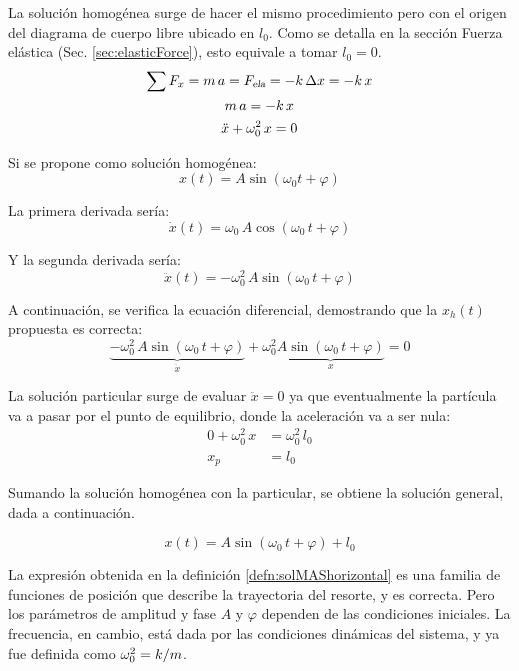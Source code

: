 La solución homogénea surge de hacer el mismo procedimiento pero con el origen del diagrama de cuerpo libre ubicado en $l_0$.
Como se detalla en la sección Fuerza elástica (Sec. \ref{sec:elasticForce}), esto equivale a tomar $l_0 = 0$.
\begin{gather*}
    \sum F_x = m \, a = {{F}_\textsl{{ela}}} = - k \, \Delta x = -k \, x
    \\
    m \, a = - k \, x
    \\
    \ddot{x} + \omega_0^2 \, x = 0
\end{gather*}

Si se propone como solución homogénea:
\[ x(t) = A \sin{(\omega_0 t + \varphi)} \]

La primera derivada sería:
\[ \dot{x}(t) = \omega_0 \, A \cos{(\omega_0 \, t + \varphi)} \]

Y la segunda derivada sería:
\[ \ddot{x}(t) = - \omega_0^2 \, A \sin{(\omega_0 \, t + \varphi)} \]

A continuación, se verifica la ecuación diferencial, demostrando que la $x_h(t)$ propuesta es correcta:
\[
    \underbrace{- \omega_0^2 \, A \sin{(\omega_0 \, t + \varphi)}}_{\ddot{x}} + \omega_0^2 \underbrace{A \sin{(\omega_0 \, t + \varphi)}}_{x} = 0
\]

La solución particular surge de evaluar $\ddot{x} = 0$ ya que eventualmente la partícula va a pasar por el punto de equilibrio, donde la aceleración va a ser nula:
\begin{align*}
    0 + \omega_0^2 \, x &= \omega_0^2 \, l_0 
    \\
    x_p &= l_0
\end{align*}

Sumando la solución homogénea con la particular, se obtiene la solución general, dada a continuación.

\begin{mdframed}[style=DefinitionFrame]
    \begin{defn}
        \label{defn:solMAShorizontal}
    \end{defn}
    \begin{equation*}
        x(t) = A \sin{(\omega_0 \, t + \varphi)} + l_0
    \end{equation*}
\end{mdframed}

La expresión obtenida en la definición \ref{defn:solMAShorizontal} es una familia de funciones de posición que describe la trayectoria del resorte, y es correcta.
Pero los parámetros de amplitud y fase $A$ y $\varphi$ dependen de las condiciones iniciales.
La frecuencia, en cambio, está dada por las condiciones dinámicas del sistema, y ya fue definida como $\omega_0^2 = k/m$.

